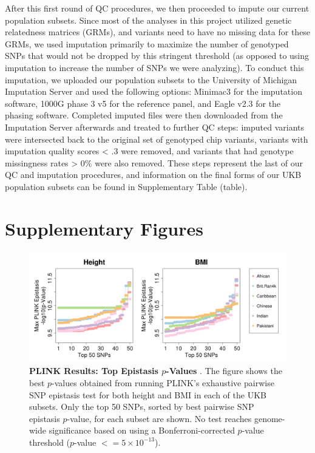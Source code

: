 \documentclass[12pt, a4paper]{article}
\begin{document}
After this first round of QC procedures, we then proceeded to impute our current population subsets. Since most of the analyses in this project utilized genetic relatedness matrices (GRMs), and variants need to have no missing data for these GRMs, we used imputation primarily to maximize the number of genotyped SNPs that would not be dropped by this stringent threshold (as opposed to using imputation to increase the number of SNPs we were analyzing). To conduct this imputation, we uploaded our population subsets to the University of Michigan Imputation Server \citep{Das2016} and used the following options: Minimac3 for the imputation software, 1000G phase 3 v5 for the reference panel, and Eagle v2.3 for the phasing software. Completed imputed files were then downloaded from the Imputation Server afterwards and treated to further QC steps: imputed variants were intersected back to the original set of genotyped chip variants, variants with imputation quality scores < .3 were removed, and variants that had genotype missingness rates > 0\% were also removed. These steps represent the last of our QC and imputation procedures, and information on the final forms of our UKB population subsets can be found in Supplementary Table (table).

\clearpage


\section{Supplementary Figures}\label{Supplementary-Figures}

\begin{figure}[htbp]
\centering
\hspace*{-1.7cm}
\includegraphics[scale=.45]{Images/Supp/InterPath_Supp_Figure_PLINK_BestSNPs_vs2_AllPops_HeightBMI.png}
\caption[TBD]{\textbf{PLINK Results: Top Epistasis $p$-Values }. The figure shows the best $p$-values obtained from running PLINK's exhaustive pairwise SNP epistasis test for both height and BMI in each of the UKB subsets. Only the top 50 SNPs, sorted by best pairwise SNP epistasis $p$-value, for each subset are shown. No test reaches genome-wide significance based on using a Bonferroni-corrected $p$-value threshold ($p$-value $<= 5\times10^{-13}$).}
\label{InterPath-Supp-Figure-PLINK-HeightBMI-AllPops}
\end{figure}
\clearpage
\end{document}
